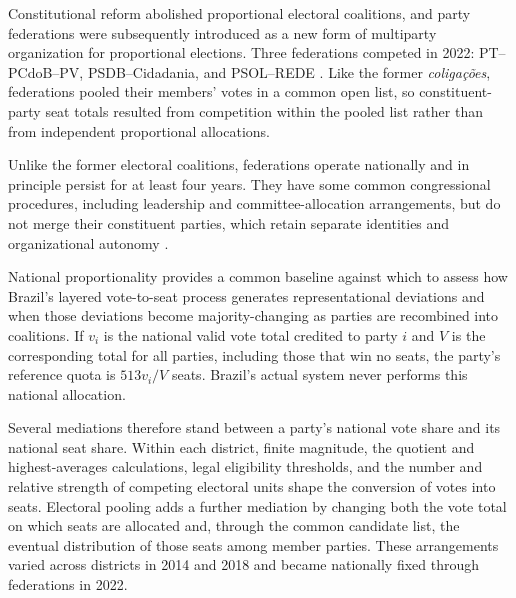 \documentclass[11pt]{article}
\begin{document}
Constitutional reform abolished proportional electoral coalitions, and party
federations were subsequently introduced as a new form of multiparty
organization for proportional elections. Three federations competed in
2022: PT--PCdoB--PV, PSDB--Cidadania, and PSOL--REDE
\parencite{tse2026registeredFederations}. Like the former
\emph{coliga\c{c}\~oes}, federations pooled their members' votes in a common
open list, so constituent-party seat totals resulted from competition within
the pooled list rather than from independent proportional allocations.

Unlike the former electoral coalitions, federations operate nationally and in
principle persist for at least four years. They have some common congressional
procedures, including leadership and committee-allocation arrangements, but do
not merge their constituent parties, which retain separate identities and
organizational autonomy \parencite{tse2021res23670}.


National proportionality provides a common baseline against which to assess how
Brazil’s layered vote-to-seat process generates representational deviations and
when those deviations become majority-changing as parties are recombined into
coalitions. If \(v_i\) is the national valid vote total credited to party \(i\)
and \(V\) is the corresponding total for all parties, including those that win
no seats, the party's reference quota is \(513v_i/V\) seats. Brazil's actual
system never performs this national allocation.

Several mediations therefore stand between a party's national vote share and its national seat share. Within each district, finite magnitude, the quotient and highest-averages calculations, legal eligibility thresholds, and the number and relative strength of competing electoral units shape the conversion of votes into seats. Electoral pooling adds a further mediation by changing both the vote total on which seats are allocated and, through the common candidate list, the eventual distribution of those seats among member parties. These arrangements varied across districts in 2014 and 2018 and became nationally fixed through federations in 2022.
\end{document}
